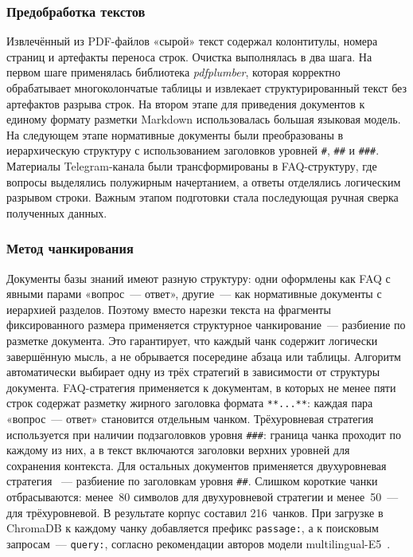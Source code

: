 \documentclass{article}
\begin{document}
\subsubsection{Предобработка текстов}

Извлечённый из PDF-файлов «сырой» текст содержал колонтитулы, номера страниц
и артефакты переноса строк. Очистка выполнялась в два шага. На первом шаге
применялась библиотека \textit{pdfplumber}, которая корректно обрабатывает
многоколончатые таблицы и извлекает структурированный текст без артефактов
разрыва строк. На втором этапе для приведения документов к единому формату разметки Markdown использовалась большая языковая модель. На следующем этапе нормативные документы были преобразованы в иерархическую структуру с использованием заголовков уровней \texttt{\#}, \texttt{\#\#} и \texttt{\#\#\#}. Материалы Telegram-канала были трансформированы в FAQ-структуру, где вопросы выделялись полужирным начертанием, а ответы отделялись логическим разрывом строки. 
Важным этапом подготовки стала последующая ручная сверка полученных данных.

\subsubsection{Метод чанкирования}

Документы базы знаний имеют разную структуру: одни оформлены как FAQ
с явными парами «вопрос~--- ответ», другие~--- как нормативные документы
с иерархией разделов. Поэтому вместо нарезки текста на фрагменты
фиксированного размера применяется структурное чанкирование~---
разбиение по разметке документа. Это гарантирует, что каждый чанк
содержит логически завершённую мысль, а не обрывается посередине абзаца
или таблицы. Алгоритм автоматически выбирает одну из трёх стратегий в зависимости
от структуры документа.
FAQ-стратегия применяется к документам, в которых не менее пяти строк
содержат разметку жирного заголовка формата \texttt{**...**}:
каждая пара «вопрос~--- ответ» становится отдельным чанком.
Трёхуровневая стратегия используется при наличии подзаголовков
уровня \texttt{\#\#\#}: граница чанка проходит по каждому из них,
а в текст включаются заголовки верхних уровней для сохранения контекста.
Для остальных документов применяется двухуровневая стратегия ~---
разбиение по заголовкам уровня \texttt{\#\#}.
Слишком короткие чанки отбрасываются: менее~80 символов для
двухуровневой стратегии и менее~50~--- для трёхуровневой.
В результате корпус составил 216~чанков.
При загрузке в ChromaDB к каждому чанку добавляется префикс
\texttt{passage:}, а к поисковым запросам~--- \texttt{query:},
согласно рекомендации авторов модели multilingual-E5~\cite{4}.
\end{document}
